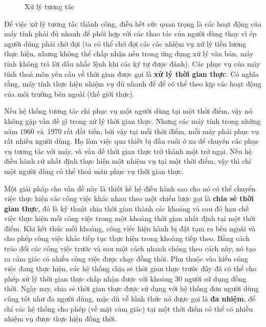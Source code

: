\begin{figure}[tb]
  \centering {}
\caption{Xử lý tương tác}
  \label{fig:fig3.2}
\end{figure}

Để việc xử lý tương tác thành công, điều hết sức quan trọng là các hoạt động của máy tính
phải đủ nhanh để phối hợp với các thao tác của người dùng thay vì ép người dùng phải chờ
đợi (ta có thể chờ đợi các các nhiệm vụ xử lý tiền lương thực hiện, nhưng không thể chấp
nhận nếu trong ứng dụng xử lý văn bản, máy tính không trả lời dấu nhắc lệnh khi các ký tự
được đánh). Các phục vụ của máy tính thoả mãn yêu cầu về thời gian được gọi là \textbf{xử
  lý thời gian thực}. Có nghĩa rằng, máy tính thực hiện nhiệm vụ đủ nhanh để để có thể
theo kịp các hoạt động của môi trường bên ngoài (thế giới thực).

Nếu hệ thống tương tác chỉ phục vụ một người dùng tại một thời điểm, vậy nó không gặp vấn
đề gì trong xử lý thời gian thực. Nhưng các máy tính trong những năm $1960$ và~$1970$ rất
đắt tiền, bởi vậy tại mỗi thời điểm, mỗi máy phải phục vụ rất nhiều người dùng. Họ làm
việc qua thiết bị đầu cuối ở xa để chuyển các phục vụ tương tác với máy, và vấn đề thời
gian thực trở thành một trở ngại. Nếu hệ điều hành cứ nhất định thực hiện một nhiệm vụ tại
một thời điểm, vậy thì chỉ một người dùng có thể thoả mãn phục vụ thời gian thực.

Một giải pháp cho vấn đề này là thiết kế hệ điều hành sao cho nó có thể chuyển việc thực
hiện các công việc khác nhau theo một chiến lược gọi là \textbf{chia sẻ thời gian thực},
đó là kỹ thuật chia thời gian thành các khoảng và sau đó hạn chế việc thực hiện mỗi công
việc trong một khoảng thời gian nhất định tại một thời điểm. Khi kết thúc mỗi khoảng, công
việc hiện hành bị đặt tạm ra bên ngoài và cho phép công việc khác tiếp tục thực hiện trong
khoảng tiếp theo. Bằng cách tráo đổi các công việc trước và sau một cách nhanh chóng theo
cách này, nó tạo ra cảm giác có nhiều công việc được chạy đồng thời. Phụ thuộc vào kiểu
công việc đang thực hiện, các hệ thống chia sẻ thời gian thực trước đây đã có thể cho phép
xử lý thời gian thực chấp nhận được với khoảng $30$ người sử dụng đồng thời. Ngày nay,
chia sẻ thời gian thực được sử dụng với hệ thống đơn người dùng cũng tốt như đa người
dùng, mặc dù về hình thức nó được gọi là \textbf{đa nhiệm}, để chỉ các hệ thống cho phép
(về mặt cảm giác) tại một thời điểm có thể có nhiều nhiệm vụ được thực hiện đồng thời.


